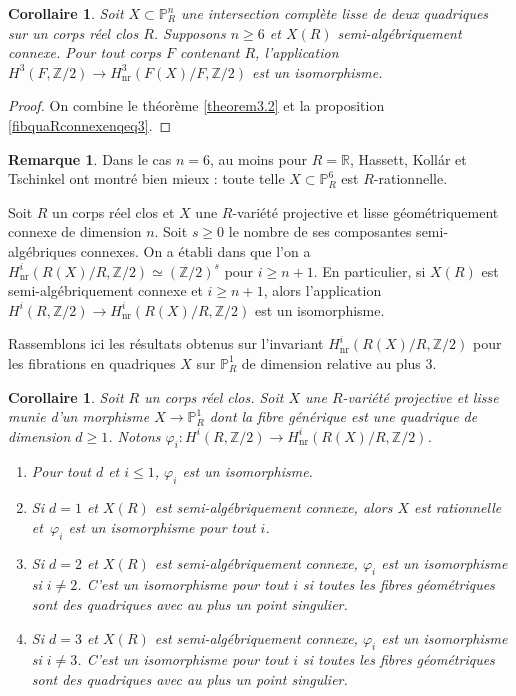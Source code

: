 \documentclass[JEP,XML,SOM,Unicode,francais,published]{cedram}
\newenvironment{enumeratea}
{\bgroup\def\theenumi{\alph{enumi}}\begin{enumerate}}
{\end{enumerate}\egroup}
\newtheorem{cor}[thm]{Corollaire}
\theoremstyle{definition}
\newtheorem{rmk}[thm]{Remarque}
\newcommand{\Z}{\mathbb Z}
\newcommand{\R}{\mathbb R}
\renewcommand{\P}{\mathbb P}
\newcommand{\on}[1]{\operatorname{#1}}
\let\phi\varphi
\begin{document}
\begin{cor}
Soit $X \subset \P^n_R$ une intersection complète lisse de deux quadriques sur un corps réel clos $R$. Supposons $n \geq 6$ et $X(R)$ semi-algébriquement connexe.
Pour tout corps $F$ contenant $R$, l'application
$H^3(F,\Z/2) \to H^3_{\on{nr}}(F(X)/F, \Z/2)$ est un isomorphisme.
\end{cor}
\begin{proof}

On combine le théorème \ref{theorem3.2} et la proposition \ref{fibquaRconnexenqeq3}.
\end{proof}

\begin{rmk}
Dans le cas $n=6$, au moins pour $R=\R$, Hassett, Kollár et Tschinkel \cite{hassett2022rationality}
ont montré bien mieux : toute telle $X \subset \P^6_{R}$ est $R$-rationnelle.
\end{rmk}

Soit $R$ un corps réel clos et $X$ une $R$-variété projective et lisse géométriquement connexe de dimension $n$.
Soit $s\geq 0$ le nombre de ses composantes semi-algébriques connexes.
On a établi dans \cite{colliot1990real} que l'on a
$ H^{i}_{\on{nr}}(R(X)/R,\Z/2) \simeq (\Z/2)^s $
pour $i\geq n+1$. En particulier, si $X(R)$ est semi-algébriquement connexe et $i\geq n+1$, alors l'application $H^i(R,\Z/2)\to H^i_{\on{nr}}(R(X)/R,\Z/2)$ est un isomorphisme.

Rassemblons ici les résultats
obtenus sur l'invariant $ H^{i}_{\on{nr}}(R(X)/R,\Z/2)$
pour les fibrations en quadriques $X$ sur $\P^1_R$
de dimension relative au plus $3$.

\begin{cor}
Soit $R$ un corps réel clos.
Soit $X$ une $R$-variété projective et lisse munie d'un
morphisme $X \to \P^1_{R}$ dont la fibre générique est une quadrique de dimension $d\geq 1$.
Notons $\phi_i : H^{i}(R,\Z/2) \to H^{i}_{\on{nr}}(R(X)/R,\Z/2)$.
\begin{enumeratea}
\item
Pour tout $d$ et $i\leq 1$, $\phi_i$ est un isomorphisme.

\item
Si $d=1$ et $X(R)$ est semi-algébriquement connexe,
alors $X$ est rationnelle et~$\phi_i$ est un isomorphisme pour tout $i$.

\item
Si $d=2$ et $X(R)$ est semi-algébriquement connexe,
$\phi_i$ est un isomorphisme si $i\neq 2$. C'est un isomorphisme pour tout $i$ si toutes les fibres géométriques sont des quadriques avec au plus un point singulier.

\item
Si $d=3$ et $X(R)$ est semi-algébriquement connexe, $\phi_i$ est un isomorphisme si $i\neq 3$. C'est un isomorphisme pour tout $i$ si toutes les fibres géométriques sont des quadriques avec au plus un point singulier.
\end{enumeratea}
\end{cor}
\end{document}

